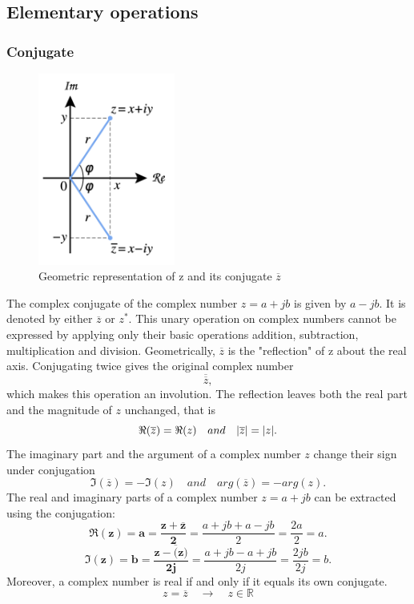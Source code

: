 \documentclass[12pt,oneside,openany]{memoir}
\numberwithin{equation}{subsection}
\DeclarePairedDelimiter{\abs}{\lvert}{\rvert}
\let\conjugate\overline
\begin{document}
\subsection{Elementary operations}
\subsubsection{Conjugate}
\begin{figure}
\centering
\captionsetup{justification=centering}
\includegraphics[width=0.4\textwidth]{images/complex_conjugate_picture.png}
\caption{Geometric representation of z and its conjugate \(\conjugate{z}\)}
\end{figure}
The complex conjugate of the complex number \(z = a + jb\) is given by \(a − jb\). It is denoted by either \(\conjugate{z}\) or \(z^*\). This unary operation on complex numbers cannot be expressed by applying only their basic operations addition, subtraction, multiplication and division.
\bigbreak
Geometrically, \(\conjugate{z}\) is the "reflection" of z about the real axis. Conjugating twice gives the original complex number
\[
	\conjugate{\conjugate{z}},
\]
which makes this operation an involution. The reflection leaves both the real part and the magnitude of \(z\) unchanged, that is
\[
	\Re(\conjugate{z}) = \Re(z) \quad and \quad \abs{\conjugate{z}} = \abs{z}.
\]
The imaginary part and the argument of a complex number \(z\) change their sign under conjugation 
\[
	\Im(\conjugate{z}) = -\Im(z) \quad and \quad arg(\conjugate{z}) = -arg(z).
\]
\vspace{1.0cm}
\bigbreak
The real and imaginary parts of a complex number \(z = a + jb\) can be extracted using the conjugation:
\[
	\boldsymbol{\Re(z) = a = \frac{z + \conjugate{z}}{2}} = \frac{a + jb + a - jb}{2} = \frac{2a}{2} = a.
\]
\[
	\boldsymbol{\Im(z) = b = \frac{z - \conjugate(z)}{2j}} = \frac{a + jb - a + jb}{2j} = \frac{2jb}{2j} = b.
\]
Moreover, a complex number is real if and only if it equals its own conjugate. 
\[
	z = \conjugate{z} \quad \rightarrow \quad z \in \mathbb{R}
\]
\end{document}
